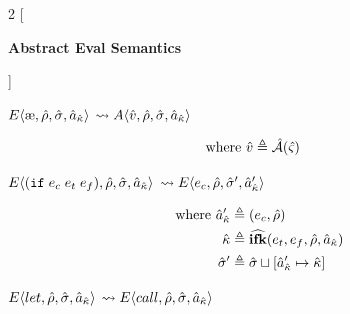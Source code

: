 \documentclass[12pt,draft]{article}
\newcommand\mae{\ensuremath{\text{\ae}}}
\newcommand{\ifsyn}[3]{(\texttt{if}\;#1\;#2\;#3)}
\newcommand{\E}[4]{E\langle #1 , #2 , #3 , #4 \rangle}
\newcommand{\A}[4]{A\langle #1 , #2 , #3 , #4 \rangle}
\begin{document}
\newpage

\newcommand{\aaeval}[0]{\hat{\mathcal{A}}}

\begin{multicols*}{2}
  [
  \begin{center}
    \textbf{Abstract Eval Semantics}
  \end{center}
  ]
  \begin{center}
    $\E{\mae}{\aenv}{\astore}{\akaddr}$
    $\leadsto \A{\aval}{\aenv}{\astore}{\akaddr}$
  \end{center}
  \vspace{-7mm}
  \begin{align*}
    \text{where }
    \aval &\triangleq \aaeval(\astate)
  \end{align*}
  \begin{center}
    $\E{\ifsyn{e_c}{e_t}{e_f}}{\aenv}{\astore}{\akaddr}$
    $\leadsto \E{e_c}{\aenv}{\astore'}{\akaddr'}$
  \end{center}
  \vspace{-7mm}
  \begin{align*}
    \text{where }
    \hat{a}_{\hat{\kappa}}' &\triangleq (e_c , \hat{\rho}) \\
    \hat{\kappa} &\triangleq \widehat{\textbf{ifk}}(e_t , e_f , \hat{\rho} , \hat{a}_{\hat{\kappa}}) \\
    \hat{\sigma}' &\triangleq \hat{\sigma} \sqcup [\hat{a}_{\hat{\kappa}}' \mapsto \hat{\kappa}]
  \end{align*}
  \begin{center}
    $\E{let}{\aenv}{\astore}{\akaddr}$
    $\leadsto \E{call}{\aenv}{\astore}{\akaddr}$
  \end{center}
  \vspace{-7mm}
  \begin{align*}

\end{align*}
\end{multicols*}
\end{document}
